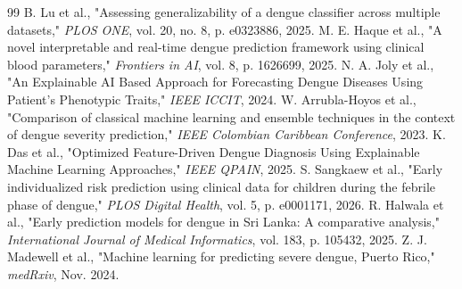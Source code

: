 \documentclass[12pt, a4paper]{report}
\begin{document}
\begin{thebibliography}{99}
 B. Lu et al., "Assessing generalizability of a dengue classifier across multiple datasets," \textit{PLOS ONE}, vol. 20, no. 8, p. e0323886, 2025.
 M. E. Haque et al., "A novel interpretable and real-time dengue prediction framework using clinical blood parameters," \textit{Frontiers in AI}, vol. 8, p. 1626699, 2025.
 N. A. Joly et al., "An Explainable AI Based Approach for Forecasting Dengue Diseases Using Patient's Phenotypic Traits," \textit{IEEE ICCIT}, 2024.
 W. Arrubla-Hoyos et al., "Comparison of classical machine learning and ensemble techniques in the context of dengue severity prediction," \textit{IEEE Colombian Caribbean Conference}, 2023.
 K. Das et al., "Optimized Feature-Driven Dengue Diagnosis Using Explainable Machine Learning Approaches," \textit{IEEE QPAIN}, 2025.
 S. Sangkaew et al., "Early individualized risk prediction using clinical data for children during the febrile phase of dengue," \textit{PLOS Digital Health}, vol. 5, p. e0001171, 2026.
 R. Halwala et al., "Early prediction models for dengue in Sri Lanka: A comparative analysis," \textit{International Journal of Medical Informatics}, vol. 183, p. 105432, 2025.
 Z. J. Madewell et al., "Machine learning for predicting severe dengue, Puerto Rico," \textit{medRxiv}, Nov. 2024.
\end{thebibliography}
\end{document}
